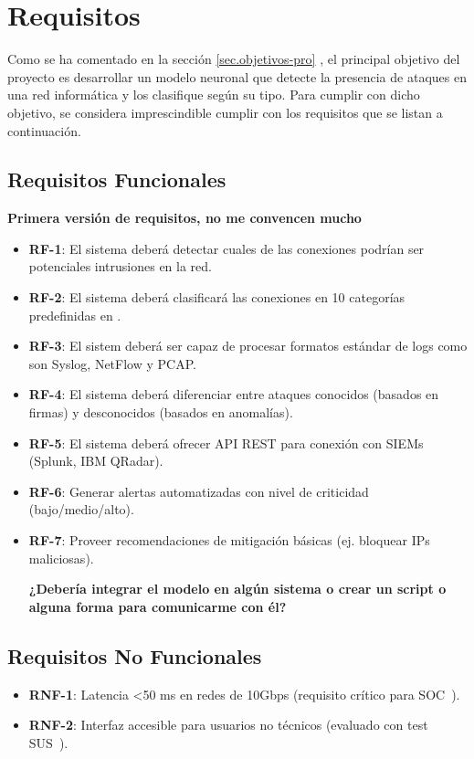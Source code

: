 \section{Requisitos}  \label{sec.requisitos} 
Como se ha comentado en la sección \ref{sec.objetivos-pro} , el principal objetivo del proyecto es desarrollar un modelo neuronal que detecte la presencia de ataques en una red informática y los clasifique según su tipo. Para cumplir con dicho objetivo, se considera imprescindible cumplir con los requisitos que se listan a continuación.

\subsection{Requisitos Funcionales}   \label{sec.req-funcionales}
\textbf{Primera versión de requisitos, no me convencen mucho}
\begin{itemize}  
    \item \textbf{RF-1}: El sistema deberá detectar cuales de las conexiones podrían ser potenciales intrusiones en la red.
    \item \textbf{RF-2}: El sistema deberá clasificará las conexiones en 10 categorías predefinidas en .  
	\item \textbf{RF-3}: El sistem deberá ser capaz de procesar formatos estándar de logs como son Syslog, NetFlow y PCAP.
	\item \textbf{RF-4}: El sistema deberá diferenciar entre ataques conocidos (basados en firmas) y desconocidos (basados en anomalías).
	\item \textbf{RF-5}: El sistema deberá ofrecer API REST para conexión con SIEMs (Splunk, IBM QRadar).
	\item \textbf{RF-6}: Generar alertas automatizadas con nivel de criticidad (bajo/medio/alto).
	\item \textbf{RF-7}: Proveer recomendaciones de mitigación básicas (ej. bloquear IPs maliciosas).

	
	
\textbf{¿Debería integrar el modelo en algún sistema o crear un script o alguna forma para comunicarme con él?}
		
\end{itemize}  

\subsection{Requisitos No Funcionales}   \label{sec.req-no-funcionales}
\begin{itemize}  
    \item \textbf{RNF-1}: Latencia <50 ms en redes de 10Gbps (requisito crítico para SOC~\cite{nist2021ai}).  
    \item \textbf{RNF-2}: Interfaz accesible para usuarios no técnicos (evaluado con test SUS~\cite{brooke1996sus}).  
\end{itemize}  

